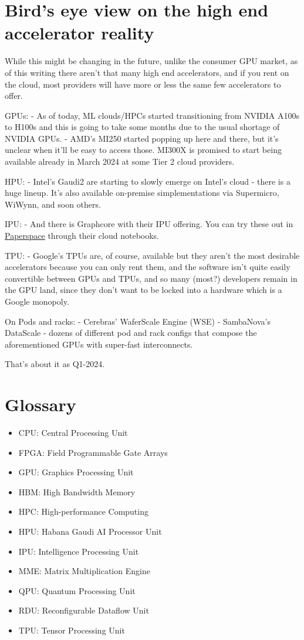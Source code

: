 \documentclass[
]{report}
\providecommand{\tightlist}{%
  \setlength{\itemsep}{0pt}\setlength{\parskip}{0pt}}\usepackage{longtable,booktabs,array}
\begin{document}
\section{Bird's eye view on the high end accelerator
reality}\label{birds-eye-view-on-the-high-end-accelerator-reality}

While this might be changing in the future, unlike the consumer GPU
market, as of this writing there aren't that many high end accelerators,
and if you rent on the cloud, most providers will have more or less the
same few accelerators to offer.

GPUs: - As of today, ML clouds/HPCs started transitioning from NVIDIA
A100s to H100s and this is going to take some months due to the usual
shortage of NVIDIA GPUs. - AMD's MI250 started popping up here and
there, but it's unclear when it'll be easy to access those. MI300X is
promised to start being available already in March 2024 at some Tier 2
cloud providers.

HPU: - Intel's Gaudi2 are starting to slowly emerge on Intel's cloud -
there is a huge lineup. It's also available on-premise simplementations
via Supermicro, WiWynn, and soon others.

IPU: - And there is Graphcore with their IPU offering. You can try these
out in \href{https://www.paperspace.com/graphcore}{Paperspace} through
their cloud notebooks.

TPU: - Google's TPUs are, of course, available but they aren't the most
desirable accelerators because you can only rent them, and the software
isn't quite easily convertible between GPUs and TPUs, and so many
(most?) developers remain in the GPU land, since they don't want to be
locked into a hardware which is a Google monopoly.

On Pods and racks: - Cerebras' WaferScale Engine (WSE) - SambaNova's
DataScale - dozens of different pod and rack configs that compose the
aforementioned GPUs with super-fast interconnects.

That's about it as Q1-2024.

\section{Glossary}\label{glossary}

\begin{itemize}
\tightlist
\item
  CPU: Central Processing Unit
\item
  FPGA: Field Programmable Gate Arrays
\item
  GPU: Graphics Processing Unit
\item
  HBM: High Bandwidth Memory
\item
  HPC: High-performance Computing
\item
  HPU: Habana Gaudi AI Processor Unit
\item
  IPU: Intelligence Processing Unit
\item
  MME: Matrix Multiplication Engine
\item
  QPU: Quantum Processing Unit
\item
  RDU: Reconfigurable Dataflow Unit
\item
  TPU: Tensor Processing Unit
\end{itemize}
\end{document}
